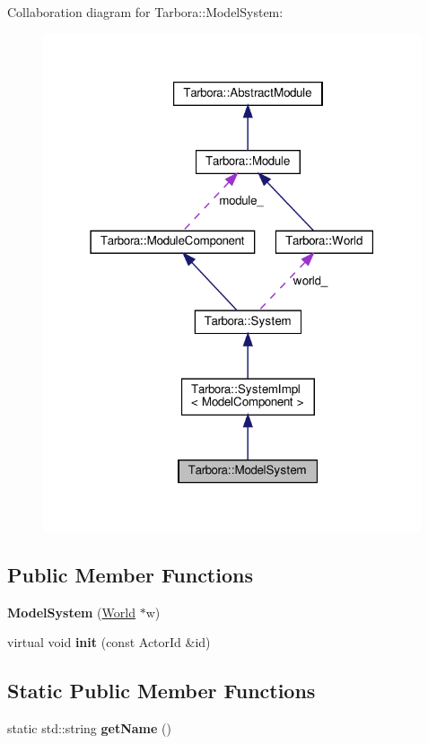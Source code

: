 Collaboration diagram for Tarbora\+:\+:Model\+System\+:
\nopagebreak
\begin{figure}[H]
\begin{center}
\leavevmode
\includegraphics[width=316pt]{classTarbora_1_1ModelSystem__coll__graph}
\end{center}
\end{figure}
\subsection*{Public Member Functions}
\begin{DoxyCompactItemize}
\item 
\mbox{\label{classTarbora_1_1ModelSystem_a086930e214d0377513654cf7d3f62c74}} 
{\bfseries Model\+System} (\hyperlink{classTarbora_1_1World}{World} $\ast$w)
\item 
\mbox{\label{classTarbora_1_1ModelSystem_a159b197bea623e2da1af73d9d8ccc619}} 
virtual void {\bfseries init} (const Actor\+Id \&id)
\end{DoxyCompactItemize}
\subsection*{Static Public Member Functions}
\begin{DoxyCompactItemize}
\item 
\mbox{\label{classTarbora_1_1ModelSystem_a6401e917f9195df0a0ea7860ad4ac815}} 
static std\+::string {\bfseries get\+Name} ()
\end{DoxyCompactItemize}
